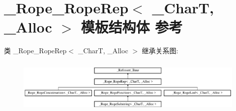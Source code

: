 \hypertarget{struct___rope___rope_rep}{}\section{\+\_\+\+Rope\+\_\+\+Rope\+Rep$<$ \+\_\+\+CharT, \+\_\+\+Alloc $>$ 模板结构体 参考}
\label{struct___rope___rope_rep}
类 \+\_\+\+Rope\+\_\+\+Rope\+Rep$<$ \+\_\+\+CharT, \+\_\+\+Alloc $>$ 继承关系图\+:\begin{figure}[H]
\begin{center}
\leavevmode
\includegraphics[height=2.629108cm]{struct___rope___rope_rep}
\end{center}
\end{figure}
